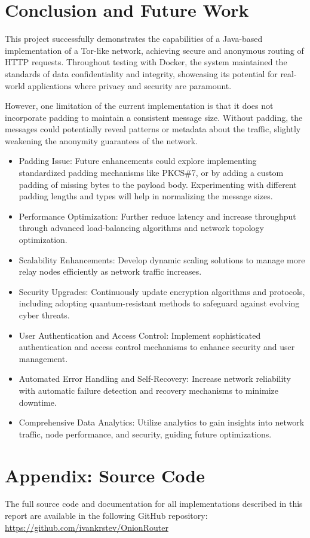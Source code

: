\documentclass[sigconf]{acmart}
\begin{document}
\section{Conclusion and Future Work}
This project successfully demonstrates the capabilities of a Java-based implementation of a Tor-like network, achieving secure and anonymous routing of HTTP requests. Throughout testing with Docker, the system maintained the standards of data confidentiality and integrity, showcasing its potential for real-world applications where privacy and security are paramount.

However, one limitation of the current implementation is that it does not incorporate padding to maintain a consistent message size. Without padding, the messages could potentially reveal patterns or metadata about the traffic, slightly weakening the anonymity guarantees of the network.

\begin{itemize}
    \item Padding Issue: Future enhancements could explore implementing standardized padding mechanisms like PKCS\#7, or by adding a custom padding of missing bytes to the payload body. Experimenting with different padding lengths and types will help in normalizing the message sizes.
    \item Performance Optimization: Further reduce latency and increase throughput through advanced load-balancing algorithms and network topology optimization.
    \item Scalability Enhancements: Develop dynamic scaling solutions to manage more relay nodes efficiently as network traffic increases.
    \item Security Upgrades: Continuously update encryption algorithms and protocols, including adopting quantum-resistant methods to safeguard against evolving cyber threats.
    \item User Authentication and Access Control: Implement sophisticated authentication and access control mechanisms to enhance security and user management.
    \item Automated Error Handling and Self-Recovery: Increase network reliability with automatic failure detection and recovery mechanisms to minimize downtime.
    \item Comprehensive Data Analytics: Utilize analytics to gain insights into network traffic, node performance, and security, guiding future optimizations.
\end{itemize}

\section{Appendix: Source Code}
The full source code and documentation for all implementations described in this report are available in the following GitHub repository: \url{https://github.com/ivankrstev/OnionRouter}
\end{document}
